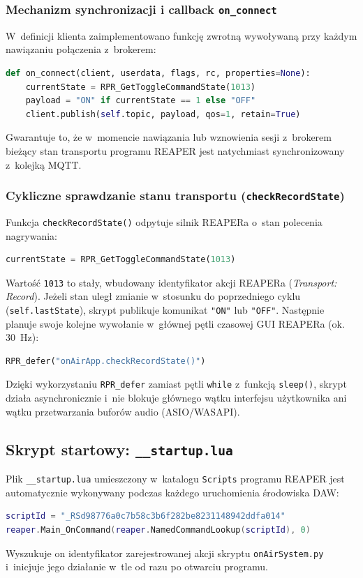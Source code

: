 \documentclass[11pt,a4paper]{article}
\begin{document}
\subsubsection{Mechanizm synchronizacji i callback \texttt{on\_connect}}
W~definicji klienta zaimplementowano funkcję zwrotną wywoływaną przy każdym nawiązaniu połączenia z~brokerem:
\begin{lstlisting}[language=Python]
def on_connect(client, userdata, flags, rc, properties=None):
    currentState = RPR_GetToggleCommandState(1013)
    payload = "ON" if currentState == 1 else "OFF"
    client.publish(self.topic, payload, qos=1, retain=True)
\end{lstlisting}
Gwarantuje to, że w~momencie nawiązania lub wznowienia sesji z~brokerem bieżący stan transportu programu REAPER jest natychmiast synchronizowany z~kolejką MQTT.

\subsubsection{Cykliczne sprawdzanie stanu transportu (\texttt{checkRecordState})}
Funkcja \texttt{checkRecordState()} odpytuje silnik REAPERa o~stan polecenia nagrywania:
\begin{lstlisting}[language=Python]
currentState = RPR_GetToggleCommandState(1013)
\end{lstlisting}
Wartość \texttt{1013} to stały, wbudowany identyfikator akcji REAPERa (\textit{Transport: Record}). Jeżeli stan uległ zmianie w~stosunku do poprzedniego cyklu (\texttt{self.lastState}), skrypt publikuje komunikat \texttt{"ON"} lub \texttt{"OFF"}. Następnie planuje swoje kolejne wywołanie w~głównej pętli czasowej GUI REAPERa (ok. 30~Hz):
\begin{lstlisting}[language=Python]
RPR_defer("onAirApp.checkRecordState()")
\end{lstlisting}
Dzięki wykorzystaniu \texttt{RPR\_defer} zamiast pętli \texttt{while} z~funkcją \texttt{sleep()}, skrypt działa asynchronicznie i~nie blokuje głównego wątku interfejsu użytkownika ani wątku przetwarzania buforów audio (ASIO/WASAPI).

\subsection{Skrypt startowy: \texttt{\_\_startup.lua}}
Plik \texttt{\_\_startup.lua} umieszczony w~katalogu \texttt{Scripts} programu REAPER jest automatycznie wykonywany podczas każdego uruchomienia środowiska DAW:
\begin{lstlisting}[language=Lua]
scriptId = "_RSd98776a0c7b58c3b6f282be8231148942ddfa014"
reaper.Main_OnCommand(reaper.NamedCommandLookup(scriptId), 0)
\end{lstlisting}
Wyszukuje on identyfikator zarejestrowanej akcji skryptu \texttt{onAirSystem.py} i~inicjuje jego działanie w~tle od razu po otwarciu programu.
\end{document}
